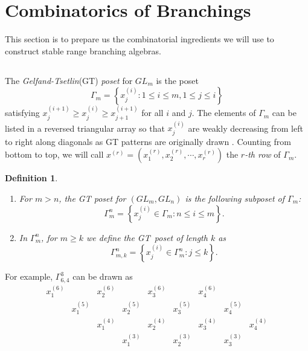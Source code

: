 \documentclass[11pt]{amsart}
\numberwithin{equation}{subsection}
\newtheorem{definition}[theorem]{Definition}
\begin{document}
\medskip


\section{Combinatorics of Branchings}

This section is to prepare us the combinatorial ingredients we will use to
construct stable range branching algebras.

\subsection{}

The \textit{Gelfand-Tsetlin}(GT) \textit{poset} for ${GL}_{m}$ is the poset
\begin{equation*}
\Gamma _{m}=\left\{ x_{j}^{(i)}:1\leq i\leq m, 1\leq j\leq i\right\}
\end{equation*}
satisfying $x_{j}^{(i+1)}\geq x_{j}^{(i)}\geq x_{j+1}^{(i+1)}$ for all $i$
and $j$. The elements of $\Gamma _{m}$ can be listed in a reversed
triangular array so that $x_{j}^{(i)}$ are weakly decreasing from left to right
along diagonals as GT patterns are originally drawn \cite{GT50}. Counting
from bottom to top, we will call $x^{(r)}=(x_{1}^{(r)},x_{2}^{(r)},
\cdots,x_{r}^{(r)})$ the \textit{$r$-th row} of $\Gamma _{m}$.

\begin{definition}
\begin{enumerate}
\item For $m>n$, the GT poset for $({GL}_{m},{GL}_{n})$ is
the following subposet of $\Gamma _{m}$:
\begin{equation*}
\Gamma _{m}^{n}=\left\{ x_{j}^{(i)}\in \Gamma _{m}:n\leq i\leq m\right\}.
\end{equation*}
\item In $\Gamma _{m}^{n}$, for $m\geq k$ we define the GT\ poset of length $k$ as
\begin{equation*}
\Gamma _{m,k}^{n}=\left\{ x_{j}^{(i)} \in \Gamma _{m}^{n}:j\leq k \right\}.
\end{equation*}
\end{enumerate}
\end{definition}

For example, $\Gamma _{6,4}^{3}$ can be drawn as
\begin{equation} \label{Gamm643}
\begin{array}{ccccccccc}
x_{1}^{(6)} &  & x_{2}^{(6)} &  & x_{3}^{(6)} &  & x_{4}^{(6)} &  &  \\ 
& x_{1}^{(5)} &  & x_{2}^{(5)} &  & x_{3}^{(5)} &  & x_{4}^{(5)} &  \\ 
&  & x_{1}^{(4)} &  & x_{2}^{(4)} &  & x_{3}^{(4)} &  & x_{4}^{(4)} \\ 
&  &  & x_{1}^{(3)} &  & x_{2}^{(3)} &  & x_{3}^{(3)} & 
\end{array}\end{equation}
\end{document}
